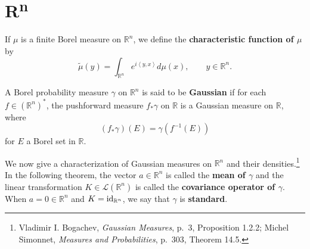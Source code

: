 \documentclass{article}
\newcommand{\inner}[2]{\left\langle #1, #2 \right\rangle}
\newcommand{\id}{\ensuremath\mathrm{id}}
\theoremstyle{definition}
\theoremstyle{definition}
\begin{document}
\section{\textbf{R}\textsuperscript{n}}
If $\mu$ is a finite Borel measure on $\mathbb{R}^n$, we define the \textbf{characteristic function of
$\mu$} by
\[
\widetilde{\mu}(y) = \int_{\mathbb{R}^n} e^{i\inner{y}{x}} d\mu(x), \qquad y \in \mathbb{R}^n.
\]

A Borel probability measure $\gamma$ on $\mathbb{R}^n$ is said to be \textbf{Gaussian} if
for each $f \in (\mathbb{R}^n)^*$, the pushforward measure
$f_* \gamma$ on $\mathbb{R}$ is a Gaussian measure on $\mathbb{R}$, where
\[
(f_* \gamma)(E)=\gamma(f^{-1}(E))
\]
 for $E$ a Borel set in
$\mathbb{R}$.

We now give a characterization of Gaussian measures on $\mathbb{R}^n$ and their densities.\footnote{Vladimir I. Bogachev,
{\em Gaussian Measures}, p.~3, Proposition 1.2.2; Michel Simonnet, {\em Measures and Probabilities},
p.~303, Theorem 14.5.} In the following theorem, the
vector $a \in \mathbb{R}^n$  is called the \textbf{mean of $\gamma$} and the 
linear transformation $K \in \mathscr{L}(\mathbb{R}^n)$ 
 is called the \textbf{covariance  operator of $\gamma$}. When $a=0 \in \mathbb{R}^n$ and $K=\id_{\mathbb{R}^n}$, we
 say that $\gamma$ is \textbf{standard}.
\end{document}
